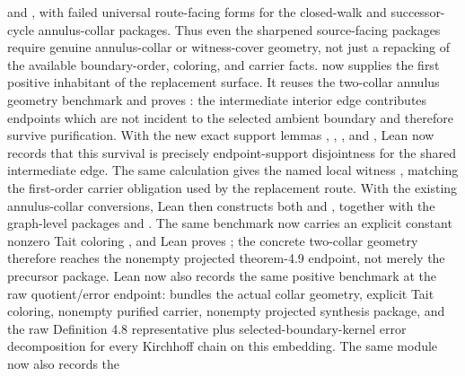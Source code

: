 \documentclass[11pt]{article}
\begin{document}
and
,
with failed universal route-facing forms for the closed-walk and
successor-cycle annulus-collar packages.  Thus even the sharpened source-facing
packages require genuine annulus-collar or witness-cover geometry, not just a
repacking of the available boundary-order, coloring, and carrier facts.
 now supplies the first
positive inhabitant of the replacement surface.  It reuses the two-collar
annulus geometry benchmark and proves
:
the intermediate interior edge contributes endpoints which are not incident to
the selected ambient boundary and therefore survive purification.  With the
new exact support lemmas
,
,
, and
, Lean
now records that this survival is precisely endpoint-support disjointness for
the shared intermediate edge.  The same calculation gives the named local
witness , matching the
first-order carrier obligation used by the replacement route.  With the
existing annulus-collar conversions, Lean then constructs both
 and
, together with
the graph-level packages
 and
.  The same benchmark
now carries an explicit constant nonzero Tait coloring
, and Lean proves
; the concrete
two-collar geometry therefore reaches the nonempty projected theorem-4.9
endpoint, not merely the precursor package.  Lean now also records the same
positive benchmark at the raw quotient/error endpoint:
bundles the actual collar geometry, explicit Tait coloring, nonempty purified
carrier, nonempty projected synthesis package, and the raw Definition 4.8
representative plus selected-boundary-kernel error decomposition for every
Kirchhoff chain on this embedding.  The same module now also records the
\end{document}
